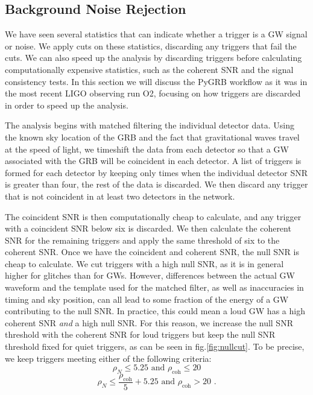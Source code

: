 \documentclass[11pt]{cuthesis}
\newcommand{\fs}{\text{ .}}
\begin{document}
\subsection{Background Noise Rejection} \label{sec:thresholds}
We have seen several statistics that can indicate whether a trigger is a GW signal or noise. We apply cuts on these statistics, discarding any triggers that fail the cuts. We can also speed up the analysis by discarding triggers before calculating computationally expensive statistics, such as the coherent SNR and the signal consistency tests. In this section we will discuss the PyGRB workflow as it was in the most recent LIGO observing run O2, focusing on how triggers are discarded in order to speed up the analysis.

The analysis begins with matched filtering the individual detector data. Using the known sky location of the GRB and the fact that gravitational waves travel at the speed of light, we timeshift the data from each detector so that a GW associated with the GRB will be coincident in each detector. A list of triggers is formed for each detector by keeping only times when the individual detector SNR is greater than four, the rest of the data is discarded. We then discard any trigger that is not coincident in at least two detectors in the network. 

The coincident SNR is then computationally cheap to calculate, and any trigger with a coincident SNR below six is discarded. We then calculate the coherent SNR for the remaining triggers and apply the same threshold of six to the coherent SNR. Once we have the coincident and coherent SNR, the null SNR is cheap to calculate. We cut triggers with a high null SNR, as it is in general higher for glitches than for GWs. However, differences between the actual GW waveform and the template used for the matched filter, as well as inaccuracies in timing and sky position, can all lead to some fraction of the energy of a GW contributing to the null SNR. In practice, this could mean a loud GW has a high coherent SNR \textit{and} a high null SNR. For this reason, we increase the null SNR threshold with the coherent SNR for loud triggers but keep the null SNR threshold fixed for quiet triggers, as can be seen in fig.\ref{fig:nullcut}. To be precise, we keep triggers meeting either of the following criteria: 
\begin{equation}
\rho_N\leq5.25 \text{  and   } \rho_\text{coh}\leq 20
\end{equation} 
\begin{equation}
\rho_N \leq \frac{\rho_\text{coh}}{5}+5.25  \text{  and   } \rho_\text{coh}> 20 \fs
\end{equation}
\end{document}
